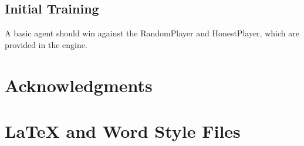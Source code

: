 \documentclass{article}
\begin{document}
\subsection{Initial Training}
A basic agent should win against the RandomPlayer and HonestPlayer, which are provided in the engine.


\section*{Acknowledgments}

\appendix

\section{\LaTeX{} and Word Style Files}\label{stylefiles}



\end{document}
